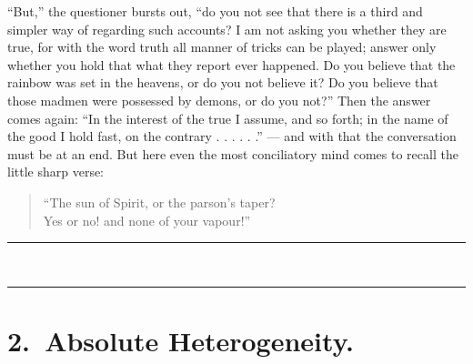\documentclass[12pt,a4paper]{book}
\newcommand{\opage}[1]{\marginnote{\footnotesize\textit{[#1]}}}
\begin{document}
``But,'' the questioner bursts out, ``do you not see that there is a third and
simpler way of regarding such accounts? I am not asking you whether they are
true, for with the word truth all manner of tricks can be played; answer only
whether you hold that what they report ever happened. Do you believe that the
rainbow was set in the heavens, or do you not believe it? Do you believe that
those madmen were possessed by demons, or do you not?'' Then the answer comes
again:
\opage{24}``In the interest of the true I assume, and so forth; in the name of
the good I hold fast, on the contrary . . . . . .'' --- and with that the
conversation must be at an end. But here even the most conciliatory mind comes
to recall the little sharp verse:

\begin{verse}
``The sun of Spirit, or the parson's taper?\\
Yes or no! and none of your vapour!''
\end{verse}

\begin{center}
\rule{1.7cm}{0.4pt}\\[1.5pt]
\rule{1.7cm}{0.4pt}
\end{center}

\chapter*{2.\ Absolute Heterogeneity.}
\label{ch:2}
\end{document}
